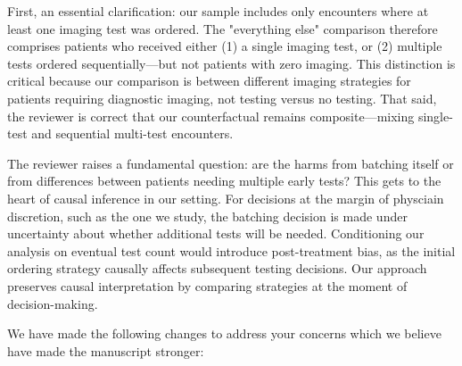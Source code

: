 \documentclass[11pt]{article}
\newcommand{\1}{\hbox{\rm 1\kern-.35em 1}}
\begin{document}
First, an essential clarification: our sample includes only encounters where at least one imaging test was ordered. The "everything else" comparison therefore comprises patients who received either (1) a single imaging test, or (2) multiple tests ordered sequentially—but not patients with zero imaging. This distinction is critical because our comparison is between different imaging strategies for patients requiring diagnostic imaging, not testing versus no testing. That said, the reviewer is correct that our counterfactual remains composite—mixing single-test and sequential multi-test encounters.

The reviewer raises a fundamental question: are the harms from batching itself or from differences between patients needing multiple early tests? This gets to the heart of causal inference in our setting. For decisions at the margin of physciain discretion, such as the one we study, the batching decision is made under uncertainty about whether additional tests will be needed. Conditioning our analysis on eventual test count would introduce post-treatment bias, as the initial ordering strategy causally affects subsequent testing decisions. Our approach preserves causal interpretation by comparing strategies at the moment of decision-making.

We have made the following changes to address your concerns which we believe have made the manuscript stronger:
\end{document}
